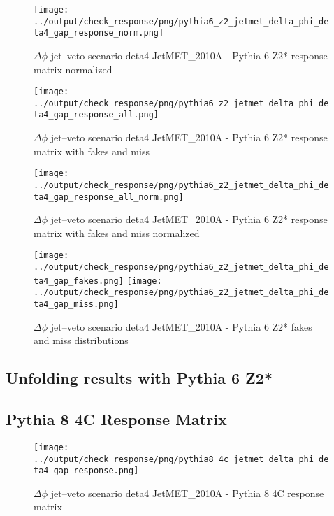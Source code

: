 \documentclass[11pt]{book}
\begin{document}
\begin{figure}[ht]
\centering
\texttt{[image: ../output/check\_response/png/pythia6\_z2\_jetmet\_delta\_phi\_deta4\_gap\_response\_norm.png]}
\caption{$\Delta\phi$ jet--veto scenario deta4 JetMET\_2010A - Pythia 6 Z2* response matrix normalized}
\label{p6_jetmet_delta_phi_deta4_gap_response_norm}
\end{figure}

\begin{figure}[ht]
\centering
\texttt{[image: ../output/check\_response/png/pythia6\_z2\_jetmet\_delta\_phi\_deta4\_gap\_response\_all.png]}
\caption{$\Delta\phi$ jet--veto scenario deta4 JetMET\_2010A - Pythia 6 Z2* response matrix with fakes and miss}
\label{p6_jetmet_delta_phi_deta4_gap_response_all}
\end{figure}

\begin{figure}[ht]
\centering
\texttt{[image: ../output/check\_response/png/pythia6\_z2\_jetmet\_delta\_phi\_deta4\_gap\_response\_all\_norm.png]}
\caption{$\Delta\phi$ jet--veto scenario deta4 JetMET\_2010A - Pythia 6 Z2* response matrix with fakes and miss normalized}
\label{p6_jetmet_delta_phi_deta4_gap_response_all_norm}
\end{figure}

\begin{figure}[ht]
\centering
\texttt{[image: ../output/check\_response/png/pythia6\_z2\_jetmet\_delta\_phi\_deta4\_gap\_fakes.png]}
\texttt{[image: ../output/check\_response/png/pythia6\_z2\_jetmet\_delta\_phi\_deta4\_gap\_miss.png]}
\caption{$\Delta\phi$ jet--veto scenario deta4 JetMET\_2010A - Pythia 6 Z2* fakes and miss distributions}
\label{p6_jetmet_delta_phi_deta4_gap_fakesmiss}
\end{figure}


\clearpage
\subsection{Unfolding results with Pythia 6 Z2*}


\clearpage
\subsection{Pythia 8 4C Response Matrix}


\begin{figure}[ht]
\centering
\texttt{[image: ../output/check\_response/png/pythia8\_4c\_jetmet\_delta\_phi\_deta4\_gap\_response.png]}
\caption{$\Delta\phi$ jet--veto scenario deta4 JetMET\_2010A - Pythia 8 4C response matrix}
\label{p8_jetmet_delta_phi_deta4_gap_response}
\end{figure}
\end{document}

